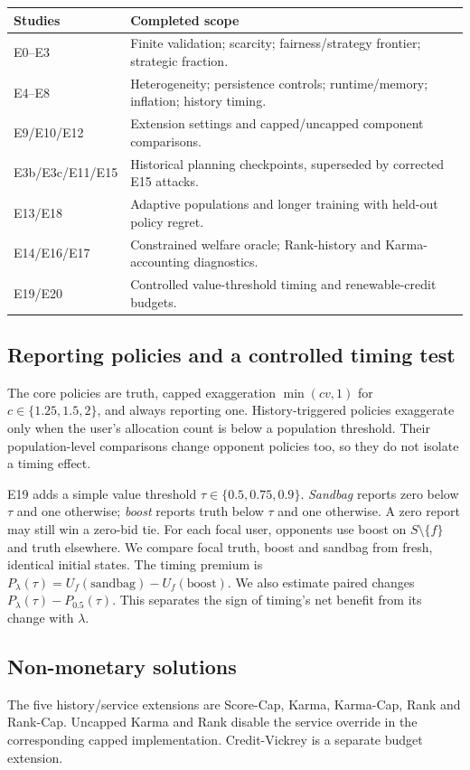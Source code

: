 \documentclass{article}
\begin{document}
\begin{center}\small\setlength{\tabcolsep}{4pt}
\begin{tabular}{lp{4.8in}}
\toprule Studies & Completed scope \\
\midrule
E0--E3 & Finite validation; scarcity; fairness/strategy frontier; strategic fraction. \\
E4--E8 & Heterogeneity; persistence controls; runtime/memory; inflation; history timing. \\
E9/E10/E12 & Extension settings and capped/uncapped component comparisons. \\
E3b/E3c/E11/E15 & Historical planning checkpoints, superseded by corrected E15 attacks. \\
E13/E18 & Adaptive populations and longer training with held-out policy regret. \\
E14/E16/E17 & Constrained welfare oracle; Rank-history and Karma-accounting diagnostics. \\
E19/E20 & Controlled value-threshold timing and renewable-credit budgets. \\
\bottomrule
\end{tabular}\end{center}

\newpage
\subsection{Reporting policies and a controlled timing test}
The core policies are truth, capped exaggeration
$\min(cv,1)$ for $c\in\{1.25,1.5,2\}$, and always reporting one.
History-triggered policies exaggerate only when the user's allocation count
is below a population threshold. Their population-level comparisons change
opponent policies too, so they do not isolate a timing effect.

E19 adds a simple value threshold $\tau\in\{0.5,0.75,0.9\}$.
\emph{Sandbag} reports zero below $\tau$ and one otherwise;
\emph{boost} reports truth below $\tau$ and one otherwise.
A zero report may still win a zero-bid tie. For each focal user, opponents
use boost on $S\setminus\{f\}$ and truth elsewhere. We compare focal truth,
boost and sandbag from fresh, identical initial states. The timing premium is
$P_\lambda(\tau)=U_f(\mathrm{sandbag})-U_f(\mathrm{boost})$.
We also estimate paired changes $P_\lambda(\tau)-P_{0.5}(\tau)$.
This separates the sign of timing's net benefit from its change with $\lambda$.

\subsection{Non-monetary solutions}
The five history/service extensions are Score-Cap, Karma, Karma-Cap, Rank
and Rank-Cap. Uncapped Karma and Rank disable the service override in the
corresponding capped implementation. Credit-Vickrey is a separate budget extension.
\end{document}

